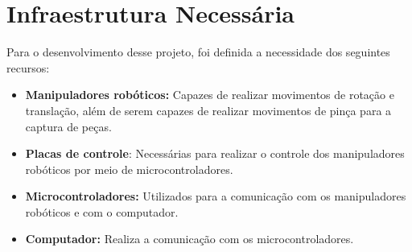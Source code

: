 \chapter[Infraestrutura Necessária]{Infraestrutura Necessária}
\label{cap:infraestrutura_necessaria}

Para o desenvolvimento desse projeto, foi definida a necessidade dos seguintes recursos:

\begin{itemize}
    \item \textbf{Manipuladores robóticos:} Capazes de realizar movimentos de rotação e translação, além de serem capazes de realizar movimentos de pinça para a captura de peças.
    \item \textbf{Placas de controle}: Necessárias para realizar o controle dos manipuladores robóticos por meio de microcontroladores.
    \item \textbf{Microcontroladores:} Utilizados para a comunicação com os manipuladores robóticos e com o computador.
    \item \textbf{Computador:} Realiza a comunicação com os microcontroladores.
\end{itemize}
